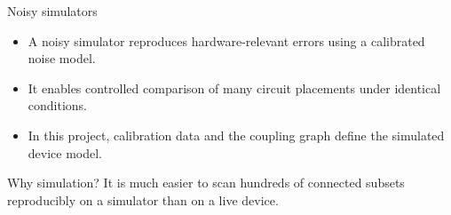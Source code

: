 \documentclass{beamer}
\begin{document}
\begin{frame}{Noisy simulators}
    \begin{itemize}
        \item A noisy simulator reproduces hardware-relevant errors using a calibrated noise model.
        \item It enables controlled comparison of many circuit placements under identical conditions.
        \item In this project, calibration data and the coupling graph define the simulated device model.
    \end{itemize}

    \begin{block}{Why simulation?}
        It is much easier to scan hundreds of connected subsets reproducibly on a simulator than on a live device.
    \end{block}
\end{frame}
\end{document}
